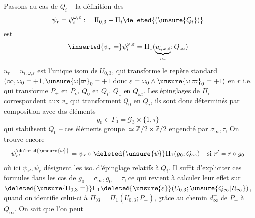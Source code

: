 Passons au cas de $Q_i$ -- la définition   des
\[
\psi_r=\psi_i^{\omega,\varepsilon}:\quad\Pi_{0,3}-\Pi_i\deleted{(\unsure{Q_i})}
\]
est
\[
\inserted{\psi_r=}\psi_i^{\omega,\varepsilon}=\Pi_1(\underbrace{u_{i,\omega,\varepsilon}}_{u_r};Q_\infty)
\]
 $u_r=u_{i,\omega,\varepsilon}$ est l'unique isom de $U_{0,3}$,  qui transforme le repère  standard $(\infty,\omega_0=+1,\unsure{\bar\omega|\varpi}_0=+1\text{ donc }\varepsilon=\omega_0\wedge\unsure{\bar\omega|\varpi}_0=+1)$ en $r$ i.e. qui transforme $P_+$ en $P_\varepsilon$, $Q_0$ en $Q_i$, $Q_1$ en $Q_{\omega i}$.  Les épinglages  de $\Pi_i$  correspondent aux $u_r$ qui transforment $Q_0$ en $Q_i$, ils sont donc déterminés par composition avec des éléments
\[
g_0\in\Gamma_0=\mathcal G_3\times\{1,\tau\}
\]
qui stabilisent $Q_0$ -- ces éléments   groupe $\simeq\mathbb Z/2\times\mathbb Z/2$ engendré par $\sigma_\infty,\tau$,  On trouve encore
\[
\psi_{r'}^{\deleted{\unsure{\omega}}}=\psi_r\circ\deleted{\unsure{\psi}}\Pi_1(g_0;Q_\infty)\quad\text{si }r'=r\circ g_0
\]
où ici $\psi_{r'},\psi_r$ désignent les iso. d'épinglage relatifs à $Q_i$. Il suffit d'expliciter ces formules dans les cas de $g_0=\sigma_\infty,g_0=\tau$, ce qui revient à calculer leur effet sur $\deleted{\unsure{\Pi_{0,3}=}}\Pi_1\deleted{\unsure{\varepsilon}}(U_{0,3};\unsure{Q_\infty|R_\infty})$, quand on identifie celui-ci à $\Pi_{03}=\Pi_1(U_{0,3};P_+)$, grâce au chemin $d_\infty^+$ de $P_+$ à $Q_\infty$. On sait que l'on peut
